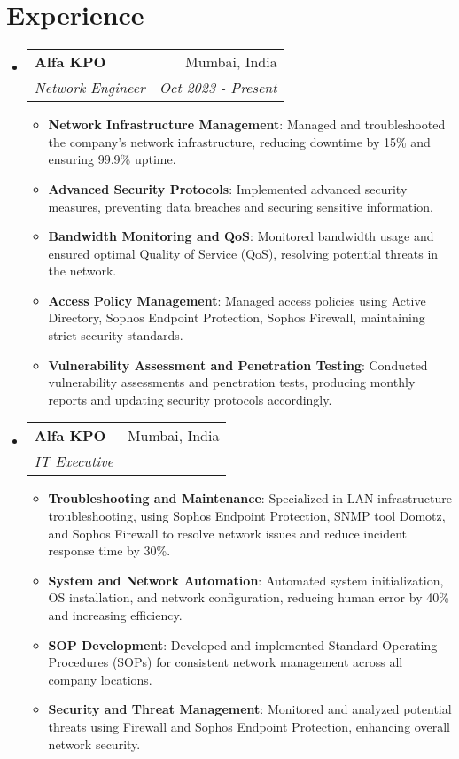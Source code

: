 \documentclass[letterpaper,10pt]{article}
\makeatletter
\newcommand{\resumeItem}[2]{
  \item\small{
    \textbf{#1}{: #2 \vspace{-2pt}}
  }
}
\newcommand{\resumeSubheading}[4]{
  \vspace{-1pt}\item
    \begin{tabular*}{0.97\textwidth}[t]{l@{\extracolsep{\fill}}r}
      \textbf{#1} & #2 \\
      \textit{\small#3} & \textit{\small #4} \\
    \end{tabular*}\vspace{-5pt}
}
\newcommand{\resumeSubHeadingListStart}{\begin{itemize}[leftmargin=*]}
\newcommand{\resumeSubHeadingListEnd}{\end{itemize}}
\newcommand{\resumeItemListStart}{\begin{itemize}}
\newcommand{\resumeItemListEnd}{\end{itemize}\vspace{-5pt}}
\makeatother
\begin{document}
\section{Experience}
  \resumeSubHeadingListStart

    \resumeSubheading
      {Alfa KPO}{Mumbai, India}
      {Network Engineer}{Oct 2023 - Present}
      \resumeItemListStart
        \resumeItem{Network Infrastructure Management}
          {Managed and troubleshooted the company's network infrastructure, reducing downtime by 15\% and ensuring 99.9\% uptime.}
        \resumeItem{Advanced Security Protocols}
          {Implemented advanced security measures, preventing data breaches and securing sensitive information.}
        \resumeItem{Bandwidth Monitoring and QoS}
          {Monitored bandwidth usage and ensured optimal Quality of Service (QoS), resolving potential threats in the network.}
        \resumeItem{Access Policy Management}
          {Managed access policies using Active Directory, Sophos Endpoint Protection, Sophos Firewall, maintaining strict security standards.}
          \resumeItem{Vulnerability Assessment and Penetration Testing}
          {Conducted vulnerability assessments and penetration tests, producing monthly reports and updating security protocols accordingly.}
      \resumeItemListEnd

    \resumeSubheading
      {Alfa KPO}{Mumbai, India}
      {IT Executive}{}
      \resumeItemListStart
        \resumeItem{Troubleshooting and Maintenance}
          {Specialized in LAN infrastructure troubleshooting, using Sophos Endpoint Protection, SNMP tool Domotz, and Sophos Firewall to resolve network issues and reduce incident response time by 30\%.}
        \resumeItem{System and Network Automation}
          {Automated system initialization, OS installation, and network configuration, reducing human error by 40\% and increasing efficiency.}
        \resumeItem{SOP Development}
          {Developed and implemented Standard Operating Procedures (SOPs) for consistent network management across all company locations.}
        \resumeItem{Security and Threat Management}
          {Monitored and analyzed potential threats using Firewall and Sophos Endpoint Protection, enhancing overall network security.}
      \resumeItemListEnd

  \resumeSubHeadingListEnd



\end{document}
